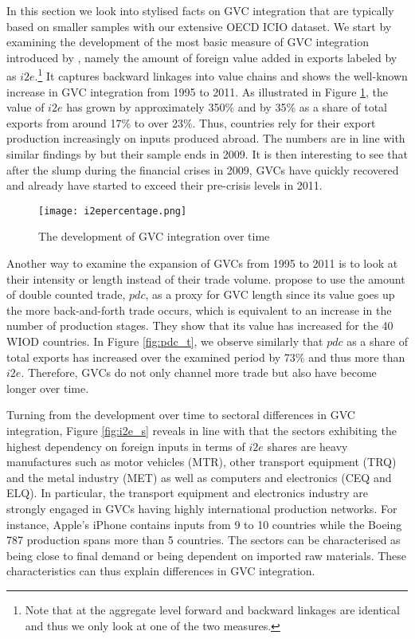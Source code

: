 \documentclass[11pt,a4paper]{article}
\begin{document}
In this section we look into stylised facts on GVC integration that are typically based on smaller samples with our extensive OECD ICIO dataset. We start by examining the development of the most basic measure of GVC integration introduced by \citet{dahuetal01}, namely the amount of foreign value added in exports labeled by \citet{ribajalo13} as $i2e$.\footnote{Note that at the aggregate level forward and backward linkages are identical and thus we only look at one of the two measures.} It captures backward linkages into value chains and shows the well-known increase in GVC integration from 1995 to 2011. As illustrated in Figure \ref{fig:i2e_t}, the value of $i2e$ has grown by approximately 350\% and by 35\% as a share of total exports from around 17\% to over 23\%. Thus, countries rely for their export production increasingly on inputs produced abroad. The numbers are in line with similar findings by \citet{rojoguno12b} but their sample ends in 2009. It is then interesting to see that after the slump during the financial crises in 2009, GVCs have quickly recovered and already have started to exceed their pre-crisis levels in 2011.

\begin{figure}
\centering
\label{fig:i2e_t}
\texttt{[image: i2epercentage.png]}
\caption{The development of GVC integration over time}
\end{figure}

Another way to examine the expansion of GVCs from 1995 to 2011 is to look at their intensity or length instead of their trade volume. \citet{zhwaetal13} propose to use the amount of double counted trade, $pdc$, as a proxy for GVC length since its value goes up the more back-and-forth trade occurs, which is equivalent to an increase in the number of production stages. They show that its value has increased for the 40 WIOD countries. In Figure \ref{fig:pdc_t}, we observe similarly that $pdc$ as a share of total exports has increased over the examined period by 73\% and thus more than $i2e$. Therefore, GVCs do not only channel more trade but also have become longer over time.


Turning from the development over time to sectoral differences in GVC integration, Figure \ref{fig:i2e_s} reveals in line with \citet{rojoguno12a} that the sectors exhibiting the highest dependency on foreign inputs in terms of $i2e$ shares are heavy manufactures such as motor vehicles (MTR), other transport equipment (TRQ) and the metal industry (MET) as well as computers and electronics (CEQ and ELQ). In particular, the transport equipment and electronics industry are strongly engaged in GVCs having highly international production networks. For instance, Apple's iPhone contains inputs from 9 to 10 countries while the Boeing 787 production spans more than 5 countries. The sectors can be characterised as being close to final demand or being dependent on imported raw materials. These characteristics can thus explain differences in GVC integration.
\end{document}
